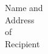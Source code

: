 \documentclass[fontsize=12pt, paper=a4]{scrlttr2}
\begin{document}
\begin{letter}{Name and \\ Address \\ of \\ Recipient}

\opening{}  %



\closing{} %

\end{letter}
\end{document}
